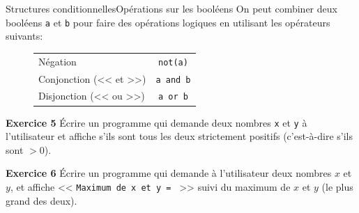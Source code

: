 \documentclass[10pt]{beamer}
\begin{document}
\begin{frame}[fragile]{Structures conditionnelles}{Opérations sur les booléens}
On peut combiner deux booléens \verb|a| et \verb|b| pour faire des opérations logiques en utilisant les opérateurs suivants:\pause
\begin{figure}
	\centering
	\begin{tabular}{|l|c|}\hline
	Négation & \verb|not(a)| \\
	Conjonction (<< et >>) & \verb|a and b| \\
	Disjonction (<< ou >>) & \verb|a or b| \\ \hline
\end{tabular}
\end{figure}
\pause

\begin{block}{\textbf{Exercice 5}}
	Écrire un programme qui demande deux nombres \verb|x| et \verb|y| à l'utilisateur et affiche s'ils sont tous les deux strictement positifs (c'est-à-dire s'ils sont $>0$).
\end{block}
\end{frame}

\begin{frame}[fragile]
	\begin{block}{\textbf{Exercice 6}}
	Écrire un programme qui demande à l'utilisateur deux nombres $x$ et $y$, et affiche << \verb|Maximum de x et y = | >> suivi du maximum de $x$ et $y$ (le plus grand des deux).
	\end{block}
\end{frame}
\end{document}
